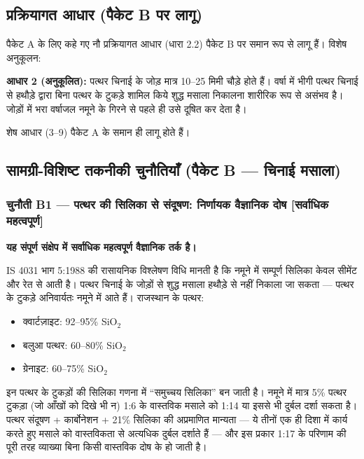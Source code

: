 \documentclass[12pt, a4paper]{article}
\begin{document}
\subsection{प्रक्रियागत आधार (पैकेट B पर लागू)}

पैकेट A के लिए कहे गए नौ प्रक्रियागत आधार (धारा 2.2) पैकेट B पर समान रूप से लागू हैं। विशेष अनुकूलन:

\textbf{आधार 2 (अनुकूलित):} पत्थर चिनाई के जोड़ मात्र 10--25 मिमी चौड़े होते हैं। वर्षा में भीगी पत्थर चिनाई से हथौड़े द्वारा बिना पत्थर के टुकड़े शामिल किये शुद्ध मसाला निकालना शारीरिक रूप से असंभव है। जोड़ों में भरा वर्षाजल नमूने के गिरने से पहले ही उसे दूषित कर देता है।

शेष आधार (3--9) पैकेट A के समान ही लागू होते हैं।

\subsection{सामग्री-विशिष्ट तकनीकी चुनौतियाँ (पैकेट B --- चिनाई मसाला)}

\subsubsection{चुनौती B1 --- पत्थर की सिलिका से संदूषण: निर्णायक वैज्ञानिक दोष \textbf{[सर्वाधिक महत्वपूर्ण]}}

\begin{criticalbox}
\textbf{यह संपूर्ण संक्षेप में सर्वाधिक महत्वपूर्ण वैज्ञानिक तर्क है।}

IS 4031 भाग 5:1988 की रासायनिक विश्लेषण विधि मानती है कि नमूने में सम्पूर्ण सिलिका केवल सीमेंट और रेत से आती है। पत्थर चिनाई के जोड़ों से शुद्ध मसाला हथौड़े से नहीं निकाला जा सकता --- पत्थर के टुकड़े अनिवार्यतः नमूने में आते हैं। राजस्थान के पत्थर:
\begin{itemize}
  \item क्वार्टज़ाइट: 92--95\% SiO$_2$
  \item बलुआ पत्थर: 60--80\% SiO$_2$
  \item ग्रेनाइट: 60--75\% SiO$_2$
\end{itemize}

इन पत्थर के टुकड़ों की सिलिका गणना में ``समुच्चय सिलिका'' बन जाती है। नमूने में मात्र 5\% पत्थर टुकड़ा (जो आँखों को दिखे भी न) 1:6 के वास्तविक मसाले को 1:14 या इससे भी दुर्बल दर्शा सकता है। पत्थर संदूषण + कार्बोनेशन + 21\% सिलिका की अप्रमाणित मान्यता --- ये तीनों एक ही दिशा में कार्य करते हुए मसाले को वास्तविकता से अत्यधिक दुर्बल दर्शाते हैं --- और इस प्रकार 1:17 के परिणाम की पूरी तरह व्याख्या बिना किसी वास्तविक दोष के हो जाती है।
\end{criticalbox}
\end{document}
